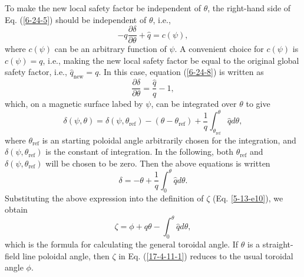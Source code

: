 \documentclass{llncs}
\newcommand{\tmop}[1]{\ensuremath{\operatorname{#1}}}
\begin{document}
To make the new local safety factor be independent of $\theta$, the right-hand
side of Eq. (\ref{6-24-5}) should be independent of $\theta$, i.e.,
\begin{equation}
  \label{6-24-8} - q \frac{\partial \delta}{\partial \theta} + \hat{q} = c
  (\psi),
\end{equation}
where $c (\psi)$ can be an arbitrary function of $\psi$. A convenient choice
for $c (\psi)$ is $c (\psi) = q$, i.e., making the new local safety factor be
equal to the original global safety factor, i.e., $\hat{q}_{\tmop{new}} = q$.
In this case, equation (\ref{6-24-8}) is written as
\begin{equation}
  \label{11-12-p1} \frac{\partial \delta}{\partial \theta} = \frac{\hat{q}}{q}
  - 1,
\end{equation}
which, on a magnetic surface labed by $\psi$, can be integrated over $\theta$
to give
\begin{equation}
  \delta (\psi, \theta) = \delta (\psi, \theta_{\tmop{ref}}) - (\theta -
  \theta_{\tmop{ref}}) + \frac{1}{q} \int_{\theta_{\tmop{ref}}}^{\theta}
  \hat{q} d \theta,
\end{equation}
where $\theta_{\tmop{ref}}$ is an starting poloidal angle arbitrarily chosen
for the integration, and $\delta (\psi, \theta_{\tmop{ref}})$ is the constant
of integration. In the following, both $\theta_{\tmop{ref}}$ and $\delta
(\psi, \theta_{\tmop{ref}})$ will be chosen to be zero. Then the above
equations is written
\begin{equation}
  \label{17-3-18-2} \delta = - \theta + \frac{1}{q} \int_0^{\theta} \hat{q} d
  \theta .
\end{equation}
Substituting the above expression into the definition of $\zeta$ (Eq.
\ref{5-13-e10}), we obtain
\begin{equation}
  \label{17-4-11-1} \zeta = \phi + q \theta - \int_0^{\theta} \hat{q} d
  \theta,
\end{equation}
which is the formula for calculating the general toroidal angle. If $\theta$
is a straight-field line poloidal angle, then $\zeta$ in Eq. (\ref{17-4-11-1})
reduces to the usual toroidal angle $\phi$.
\end{document}

